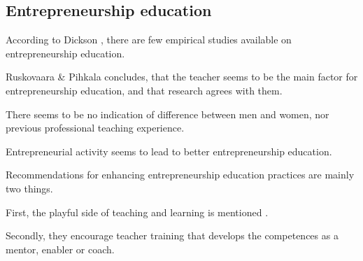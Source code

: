 \subsection{Entrepreneurship education}

%

%

According to Dickson \cite{dickson}, there are few empirical studies available on entrepreneurship education.

Ruskovaara \& Pihkala \cite{ruskovaara} concludes, that the teacher seems to be the main factor for entrepreneurship education, and that research agrees with them.

There seems to be no indication of difference between men and women, nor previous professional teaching experience.

Entrepreneurial activity seems to lead to better entrepreneurship education.

Recommendations for enhancing entrepreneurship education practices are mainly two things.

First, the playful side of teaching and learning is mentioned \cite{solomon}.

Secondly, they encourage teacher training that develops the competences as a mentor, enabler or coach.
